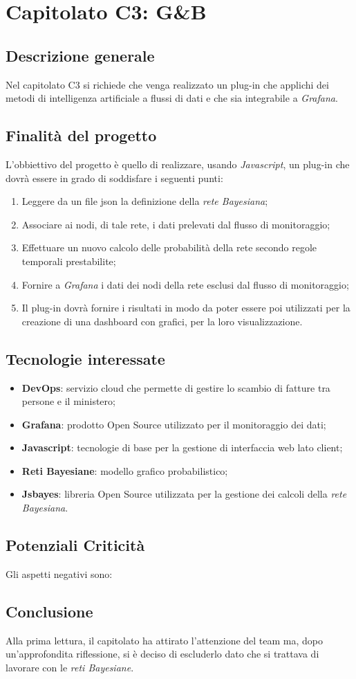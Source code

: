 \chapter{Capitolato C3: G\&B}
\section{Descrizione generale}
Nel capitolato C3 si richiede che venga realizzato un plug-in che applichi dei metodi di intelligenza artificiale a flussi di dati e che sia integrabile a \emph{Grafana}.
\section{Finalit\`a del progetto}
L'obbiettivo del progetto è quello di realizzare, usando \emph{Javascript}, un plug-in che dovrà essere in grado di soddisfare i seguenti punti:
\begin{enumerate}
	\item Leggere da un file json la definizione della \emph{rete Bayesiana};
	\item Associare ai nodi, di tale rete, i dati prelevati dal flusso di monitoraggio;
	\item Effettuare un nuovo calcolo delle probabilit\`a della rete secondo regole temporali prestabilite;
	\item Fornire a \emph{Grafana} i dati dei nodi della rete esclusi dal flusso di monitoraggio;
	\item Il plug-in dovrà fornire i risultati in modo da poter essere poi utilizzati per la creazione di una dashboard con grafici, per la loro visualizzazione. 
\end{enumerate}
\section{Tecnologie interessate}
\begin{itemize}
	\item \textbf{DevOps}: servizio cloud che permette di gestire lo scambio di fatture tra persone e il ministero;
	\item \textbf{Grafana}: prodotto Open Source utilizzato per il monitoraggio dei dati;
	\item \textbf{Javascript}: tecnologie di base per la gestione di interfaccia web lato client;
	\item \textbf{Reti Bayesiane}: modello grafico probabilistico;
	\item \textbf{Jsbayes}: libreria Open Source utilizzata per la gestione dei calcoli della \emph{rete Bayesiana}.
\end{itemize}
\section{Potenziali Criticità}
Gli aspetti negativi sono:
\section{Conclusione}
Alla prima lettura, il capitolato ha attirato l'attenzione del team ma, dopo un'approfondita riflessione, si è deciso di escluderlo dato che si trattava di lavorare con le \emph{reti Bayesiane}.